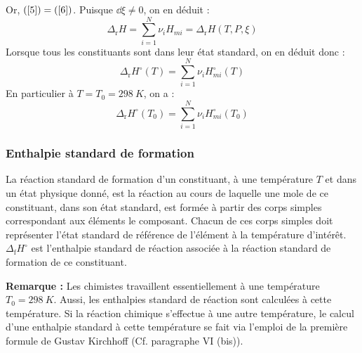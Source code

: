 \documentclass{article}
\let\oldref\ref
\renewcommand{\ref}[1]{(\oldref{#1})}
\newcommand{\Dr}{\Delta_{\mathrm{r}}}
\newcommand{\Df}{\Delta_{\mathrm{f}}}
\begin{document}
\begin{tableau}
Or, $\ref{5}=\ref{6}$. Puisque $\dd{\xi} \neq 0$, on en déduit :
\begin{equation*}
    \Dr H = \sum_{i=1}^N \nu_i H_{mi} = \Dr H(T,P,\xi)
\end{equation*}
Lorsque tous les constituants sont dans leur état standard, on en déduit donc :
\begin{equation*}
    \Dr H^\circ(T) = \sum_{i=1}^N \nu_i H_{mi}^\circ(T)
\end{equation*}
En particulier à $T=T_0=\SI{298}{K}$, on a :
\begin{equation*}
    \Dr H^\circ(T_0) = \sum_{i=1}^N \nu_i H_{mi}^\circ(T_0)
\end{equation*}
\end{tableau}

\subsubsection{Enthalpie standard de formation}
\begin{enonce}
    La réaction standard de formation d'un constituant, à une température $T$ et dans un état physique donné, est la réaction au cours de laquelle une mole de ce constituant, dans son état standard, est formée à partir des corps simples correspondant aux éléments le composant. Chacun de ces corps simples doit représenter l'état standard de référence de l'élément à la température d'intérêt. $\Df H^\circ$ est l’enthalpie standard de réaction associée à la réaction standard de formation de ce constituant.
\end{enonce}

\textbf{Remarque :} Les chimistes travaillent essentiellement à une température $T_0 = \SI{298}{K}$. Aussi, les enthalpies standard de réaction sont calculées à cette température. Si la réaction chimique s’effectue à une autre température, le calcul d’une enthalpie standard à cette température se fait via l’emploi de la première formule de Gustav Kirchhoff (Cf. paragraphe \textsf{VI} (bis)).
\end{document}
